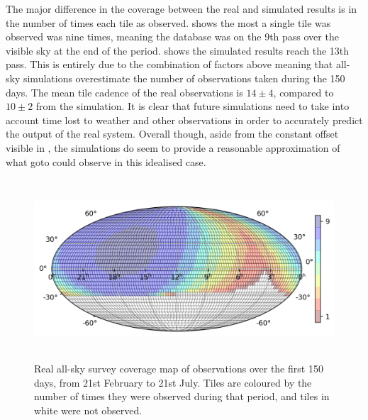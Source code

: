 \begin{colsection}
\begin{colsection}
The major difference in the coverage between the real and simulated results is in the number of times each tile as observed.  shows the most a single tile was observed was nine times, meaning the database was on the 9th pass over the visible sky at the end of the period.  shows the simulated results reach the 13th pass. This is entirely due to the combination of factors above meaning that all-sky simulations overestimate the number of observations taken during the 150 days. The mean tile cadence of the real observations is $14\pm4$, compared to $10\pm2$ from the simulation. It is clear that future simulations need to take into account time lost to weather and other observations in order to accurately predict the output of the real system. Overall though, aside from the constant offset visible in , the simulations do seem to provide a reasonable approximation of what \gls{goto} could observe in this idealised case.

\begin{figure}[p]
    \begin{center}
        \includegraphics[height=190pt]{images/survey_sims/150_1N4_real.png}
    \end{center}
    \caption[Real survey observations over 150 days]{
        Real all-sky survey coverage map of observations over the first 150 days, from 21st February to 21st July. Tiles are coloured by the number of times they were observed during that period, and tiles in white were not observed.
    }\label{fig:survey_real_150}
\end{figure}


\end{colsection}
\end{colsection}
